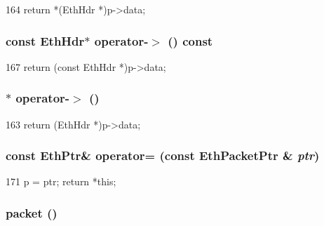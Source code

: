 \begin{DoxyCode}
164 { return *(EthHdr *)p->data; }
\end{DoxyCode}
\hypertarget{classNet_1_1EthPtr_a99f34a16b79c9394a9a8f011186a52ed}{
\subsubsection[{operator-\/$>$}]{\setlength{\rightskip}{0pt plus 5cm}const {\bf EthHdr}$\ast$ operator-\/$>$ () const}}
\label{classNet_1_1EthPtr_a99f34a16b79c9394a9a8f011186a52ed}



\begin{DoxyCode}
167 { return (const EthHdr *)p->data; }
\end{DoxyCode}
\hypertarget{classNet_1_1EthPtr_a2052a08e4c8b20c791ce160b46616234}{
\subsubsection[{operator-\/$>$}]{$\ast$ operator-\/$>$ ()}}
\label{classNet_1_1EthPtr_a2052a08e4c8b20c791ce160b46616234}



\begin{DoxyCode}
163 { return (EthHdr *)p->data; }
\end{DoxyCode}
\hypertarget{classNet_1_1EthPtr_a2dd4c8ad09a8ada02ddfd93b9d0ab4e4}{
\subsubsection[{operator=}]{\setlength{\rightskip}{0pt plus 5cm}const {\bf EthPtr}\& operator= (const {\bf EthPacketPtr} \& {\em ptr})}}
\label{classNet_1_1EthPtr_a2dd4c8ad09a8ada02ddfd93b9d0ab4e4}



\begin{DoxyCode}
171 { p = ptr; return *this; }
\end{DoxyCode}
\hypertarget{classNet_1_1EthPtr_a549ac5c293e8047f1be38ca356e160da}{
\subsubsection[{packet}]{ packet ()}}
\label{classNet_1_1EthPtr_a549ac5c293e8047f1be38ca356e160da}



